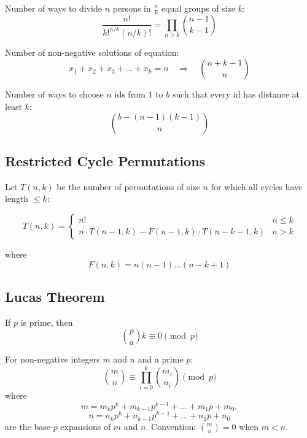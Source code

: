 Number of ways to divide $n$ persons in $\tfrac{n}{k}$ equal groups of size $k$:
\[
\frac{n!}{k!^{n/k}(n/k)!} = \prod_{n \geq k} \binom{n-1}{k-1}
\]

Number of non-negative solutions of equation:
\[
x_1+x_2+x_3+\dots+x_k=n \quad \Rightarrow \quad \binom{n+k-1}{n}
\]

Number of ways to choose $n$ ids from $1$ to $b$ such that every id has distance at least $k$:
\[
\binom{b-(n-1)(k-1)}{n}
\]


\subsection*{Restricted Cycle Permutations}

Let $T(n,k)$ be the number of permutations of size $n$ for which all cycles have length $\leq k$:

\[
T(n,k) = 
\begin{cases} 
n! & n \leq k \\
n \cdot T(n-1,k) - F(n-1,k)\cdot T(n-k-1,k) & n > k
\end{cases}
\]

where
\[
F(n,k) = n(n-1)\dots(n-k+1)
\]


\subsection*{Lucas Theorem}

If $p$ is prime, then
\[
\binom{p}{a}{k} \equiv 0 \pmod{p}
\]

For non-negative integers $m$ and $n$ and a prime $p$:
\[
\binom{m}{n} \equiv \prod_{i=0}^k \binom{m_i}{n_i} \pmod{p}
\]
where
\[
m = m_k p^k + m_{k-1} p^{k-1} + \dots + m_1 p + m_0,
\]
\[
n = n_k p^k + n_{k-1} p^{k-1} + \dots + n_1 p + n_0
\]
are the base-$p$ expansions of $m$ and $n$.  
Convention: $\binom{m}{n}=0$ when $m<n$.
